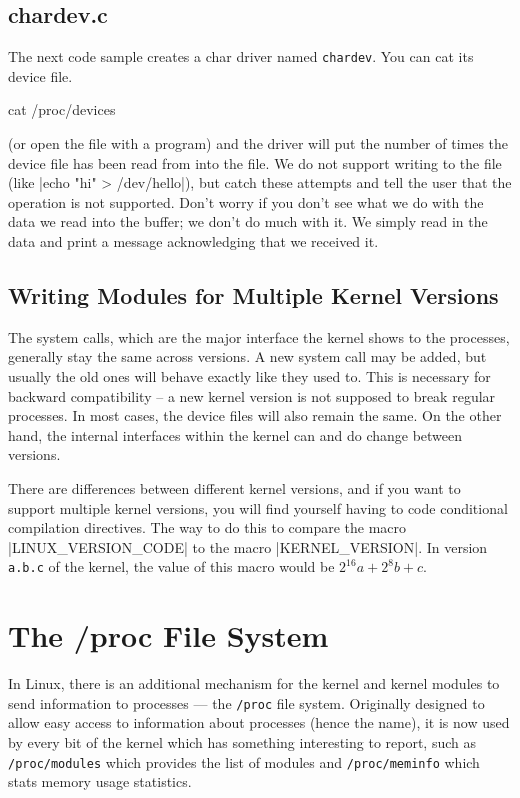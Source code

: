 \documentclass[10pt, oneside]{book}
\begin{document}
\subsection{chardev.c}
\label{sec:org7ce767e}
The next code sample creates a char driver named \verb|chardev|.
You can cat its device file.

\begin{codebash}
cat /proc/devices
\end{codebash}

(or open the file with a program) and the driver will put the number of times the device file has been read from into the file.
We do not support writing to the file (like \sh|echo "hi" > /dev/hello|), but catch these attempts and tell the user that the operation is not supported.
Don't worry if you don't see what we do with the data we read into the buffer; we don't do much with it.
We simply read in the data and print a message acknowledging that we received it.


\subsection{Writing Modules for Multiple Kernel Versions}
\label{sec:modules_for_versions}
The system calls, which are the major interface the kernel shows to the processes, generally stay the same across versions.
A new system call may be added, but usually the old ones will behave exactly like they used to.
This is necessary for backward compatibility -- a new kernel version is not supposed to break regular processes.
In most cases, the device files will also remain the same. On the other hand, the internal interfaces within the kernel can and do change between versions.

There are differences between different kernel versions, and if you want to support multiple kernel versions, you will find yourself having to code conditional compilation directives.
The way to do this to compare the macro \cpp|LINUX_VERSION_CODE| to the macro \cpp|KERNEL_VERSION|.
In version \verb|a.b.c| of the kernel, the value of this macro would be \(2^{16}a+2^{8}b+c\).

\section{The /proc File System}
\label{sec:procfs}
In Linux, there is an additional mechanism for the kernel and kernel modules to send information to processes --- the \verb|/proc| file system.
Originally designed to allow easy access to information about processes (hence the name), it is now used by every bit of the kernel which has something interesting to report, such as \verb|/proc/modules| which provides the list of modules and \verb|/proc/meminfo| which stats memory usage statistics.
\end{document}
